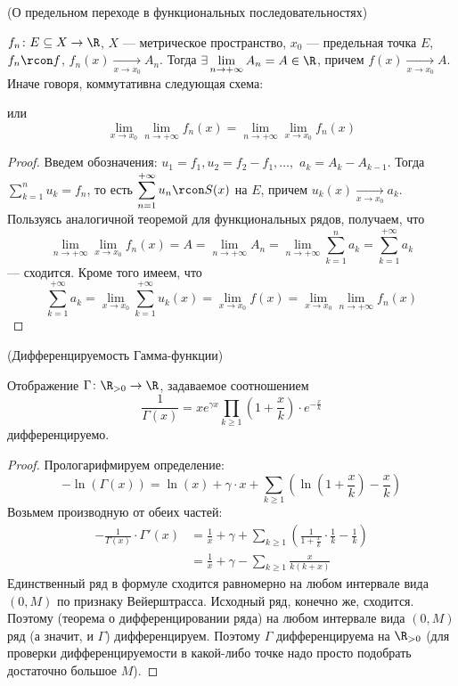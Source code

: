 \begin{theorem}(О предельном переходе в функциональных последовательностях)

    $f_n \colon E \subseteq X \to \R$, $X$ --- метрическое пространство,
    $x_0$ --- предельная точка $E$, $f_n \rcon f$, $f_n(x) \xrightarrow[x \to
    x_0]{} A_n$. Тогда $\displaystyle \exists \lim_{n \to +\infty}{A_n} = A \in
    \R$, причем $f(x) \xrightarrow[x \to x_0]{} A$.
    Иначе говоря, коммутативна следующая схема:


    или
\[
    \lim_{x \to x_0}{\lim_{n \to +\infty}{f_n(x)}}
    = \lim_{n \to +\infty}{\lim_{x \to x_0}{f_n(x)}}
\]
\end{theorem}
\begin{proof}
    Введем обозначения: $u_1 = f_1, u_2 = f_2 - f_1, \ldots,$ $a_k = A_k -
    A_{k - 1}$. Тогда $\displaystyle \sum_{k = 1}^{n}{u_k} = f_n$, то есть
    $\displaystyle \sum_{n = 1}^{+\infty}{u_n} \rcon S(x)$ на $E$, причем
    $u_k(x) \xrightarrow[x \to x_0]{} a_k$. Пользуясь аналогичной теоремой для
    функциональных рядов, получаем, что
\[
    \lim_{n \to +\infty}{\lim_{x \to x_0}{f_n(x)}} = A = \lim_{n \to
    +\infty}{A_n} = \lim_{n \to +\infty}{\sum_{k = 1}^{n}{a_k}} = \sum_{k =
    1}^{+\infty}{a_k}
\]
    --- сходится. Кроме того имеем, что
\[
    \sum_{k = 1}^{+\infty}{a_k} = \lim_{x \to x_0}{\sum_{k =
    1}^{+\infty}{u_k(x)}} = \lim_{x \to x_0}{f(x)} = \lim_{x \to x_0}{\lim_{n
    \to +\infty}{f_n(x)}}
\]
\end{proof}

\begin{theorem}(Дифференцируемость Гамма-функции)
	
	Отображение $\Gamma \colon \R_{>0} \to \R$, задаваемое соотношением
\[
	\frac{1}{\Gamma(x)} = x e^{\gamma x} \prod_{k \geqslant 1}
	{\left(1 + \frac{x}{k}\right) \cdot e^{-\frac{x}{k}}}
\]
	дифференцируемо.
\end{theorem}
\begin{proof}
	Прологарифмируем определение:
\[
	-\ln(\Gamma(x)) = \ln(x) + \gamma \cdot x + \sum_{k \geqslant 1}
	{\left(\ln\left(1 + \frac{x}{k}\right) - \frac{x}{k}\right)}
\]
	Возьмем производную от обеих частей:
\begin{align*}
	-\frac{1}{\Gamma(x)} \cdot \Gamma'(x) &= \frac{1}{x} + \gamma +
	\sum_{k \geqslant 1}{\left(\frac{1}{1 + \frac{x}{k}} \cdot \frac{1}{k}
	- \frac{1}{k}\right)} \\
	&= \frac{1}{x} + \gamma - \sum_{k \geqslant 1}{\frac{x}{k (k + x)}}
\end{align*}
	Единственный ряд в формуле сходится равномерно на любом интервале вида
	$(0, M)$ по признаку Вейерштрасса. Исходный ряд, конечно же, сходится. Поэтому
	(теорема о дифференцировании ряда) на любом интервале вида $(0, M)$ ряд
	(а значит, и $\Gamma$) дифференцируем. Поэтому $\Gamma$ дифференцируема на
	$\R_{>0}$ (для проверки дифференцируемости в какой-либо точке надо просто 
	подобрать достаточно большое $M$).
\end{proof}

